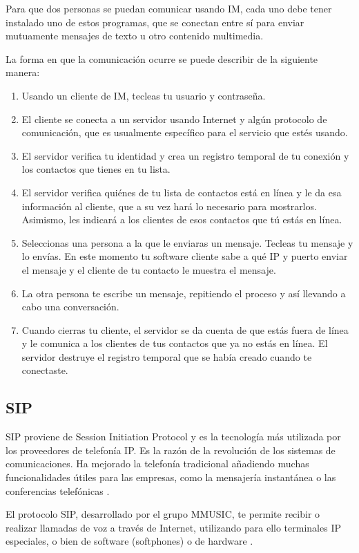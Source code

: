 Para que dos personas se puedan comunicar usando IM, cada uno debe tener instalado uno de estos programas, que se conectan entre sí para enviar mutuamente mensajes de texto u otro contenido multimedia.

La forma en que la comunicación ocurre se puede describir de la siguiente manera:

\begin{enumerate}
  \item Usando un cliente de IM, tecleas tu usuario y contraseña.
  \item El cliente se conecta a un servidor usando Internet y algún protocolo de comunicación, que es usualmente específico para el servicio que estés usando.
  \item El servidor verifica tu identidad y crea un registro temporal de tu conexión y los contactos que tienes en tu lista.
  \item El servidor verifica quiénes de tu lista de contactos está en línea y le da esa información al cliente, que a su vez hará lo necesario para mostrarlos. Asimismo, les indicará a los clientes de esos contactos que tú estás en línea.
  \item Seleccionas una persona a la que le enviaras un mensaje. Tecleas tu mensaje y lo envías. En este momento tu software cliente sabe a qué IP y puerto enviar el mensaje y el cliente de tu contacto le muestra el mensaje.
  \item La otra persona te escribe un mensaje, repitiendo el proceso y así llevando a cabo una conversación.
  \item Cuando cierras tu cliente, el servidor se da cuenta de que estás fuera de línea y le comunica a los clientes de tus contactos que ya no estás en línea. El servidor destruye el registro temporal que se había creado cuando te conectaste.
\end{enumerate}

\subsection{SIP}

SIP proviene de Session Initiation Protocol y es la tecnología más utilizada por los proveedores de telefonía IP. Es la razón de la revolución de los sistemas de comunicaciones. Ha mejorado la telefonía tradicional añadiendo muchas funcionalidades útiles para las empresas, como la mensajería instantánea o las conferencias telefónicas \cite{webrtc2}.

El protocolo SIP, desarrollado por el grupo MMUSIC, te permite recibir o realizar llamadas de voz a través de Internet, utilizando para ello terminales IP especiales, o bien de software (softphones) o de hardware \cite{webrtc1}.

